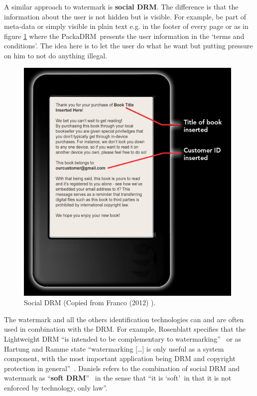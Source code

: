 \documentclass[11pt,a4paper,oneside]{memoir}
\begin{document}
A similar approach to watermark is \textbf{social DRM}\label{def:social_drm}. The difference is that the information about the user is not hidden but is visible. For example, be part of meta-data or simply visible in plain text e.g. in the footer of every page or as in figure \ref{fig:def:drm_socialDRM} where the PackaDRM\texttrademark ~presents the user information in the \textquoteleft terms and conditions\textquoteright. The idea here is to let the user do what he want but putting pressure on him to not do anything illegal. 
\begin{figure}[h]
   \centering
   	\includegraphics[width=11cm]{PackaDRM}%
   \caption{Social DRM (Copied from Franco (2012) \cite{kevinfranco:socialDRM}).}
   \label{fig:def:drm_socialDRM}
\end{figure}

The watermark and all the others identification technologies can and are often used in combination with the DRM. For example, Rosenblatt specifies that the Lightweight DRM \textquotedblleft is intended to be complementary to watermarking\textquotedblright ~\cite{idpf:lcp-rfp} or as Hartung and Ramme state \textquotedblleft watermarking [\ldots] is only useful as a system component, with the most important application being DRM and copyright protection in general\textquotedblright ~\cite{ieee:drm_watermark}. Daniels refers to the combination of social DRM and watermark as \textquotedblleft \textbf{soft DRM}\textquotedblright ~\cite{dan:hard-soft-drm-2} in the sense that \textquotedblleft it is \textquoteleft soft\textquoteright ~in that it is not enforced by technology, only law\textquotedblright.
\end{document}
